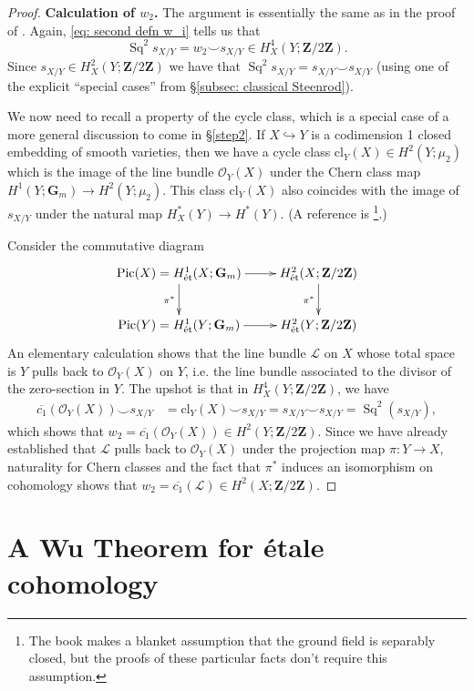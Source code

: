 \documentclass[10pt, reqno]{amsart}
\numberwithin{equation}{subsection}
\newcommand{\G}{\mathbf{G}}
\newcommand{\Z}{\mathbf{Z}}
\newcommand{\ol}[1]{\overline{#1}}
\newcommand{\Cal}[1]{\mathcal{#1}}
\newcommand{\mrm}[1]{\mathrm{#1}}
\DeclareMathOperator{\et}{\acute{e}t}
\DeclareMathOperator{\Pic}{Pic}
\DeclareMathOperator{\Sq}{Sq}
\theoremstyle{remark}
\begin{document}
\begin{proof}
\noindent \textbf{Calculation of $w_2$.} The argument is essentially the same as in the proof of \cite[Lemma 2.6]{Urabe96}. Again, \eqref{eq: second defn w_i} tells us that
\[
\Sq^2 s_{X/Y} = w_2 \smile s_{X/Y} \in H^4_X(Y; \Z/2\Z). 
\]
Since $s_{X/Y} \in H^2_X(Y; \Z/2\Z)$ we have that $\Sq^2s_{X/Y} = s_{X/Y} \smile s_{X/Y}$ (using one of the explicit ``special cases'' from \S \ref{subsec: classical Steenrod}). 


We now need to recall a property of the cycle class, which is a special case of a more general discussion to come in \S \ref{step2}. If $X \hookrightarrow Y$ is a codimension 1 closed embedding of smooth varieties, then we have a cycle class $\mrm{cl}_Y(X) \in H^2(Y; \mu_2)$ which is the image of the line bundle $\Cal{O}_Y(X)$ under the Chern class map $H^1(Y; \G_m) \rightarrow H^2(Y; \mu_2)$. This class $\mrm{cl}_Y(X)$ also coincides with the image of $s_{X/Y}$ under the natural map $H_X^*(Y) \rightarrow H_{\et}^*(Y)$. (A reference is \cite[Proposition II.2.2 and Proposition II.2.6]{FK88}\footnote{The book \cite{FK88} makes a blanket assumption that the ground field is separably closed, but the proofs of these particular facts don't require this assumption.}.)

Consider the commutative diagram 
\[
\xymatrix{
\Pic(X)  = H^1_{\et}(X; \G_m) \ar[r] \ar[d]_{\pi^*} & H^2_{\et}(X; \Z/2\Z) \ar[d]_{\pi^*} \\
\Pic(Y) = H^1_{\et}(Y; \G_m) \ar[r] & H^2_{\et}(Y; \Z/2\Z)
}
\]
An elementary calculation shows that the line bundle $\Cal{L}$ on $X$ whose total space is $Y$ pulls back to $\Cal{O}_Y(X)$ on $Y$, i.e. the line bundle associated to the divisor of the zero-section in $Y$. The upshot is that in $H^4_X(Y; \Z/2\Z)$, we have 
\begin{align*}
\ol{c_1}(\Cal{O}_Y(X)) \smile s_{X/Y} & =\mrm{cl}_Y(X) \smile s_{X/Y} = s_{X/Y} \smile s_{X/Y} = \Sq^2 (s_{X/Y} ),
\end{align*}
which shows that $w_2 = \ol{c_1}(\Cal{O}_Y(X)) \in H^2_{\et}(Y; \Z/2\Z)$. Since we have already established that $\Cal{L}$ pulls back to $\Cal{O}_Y(X)$ under the projection map $\pi \colon Y \rightarrow X$, naturality for Chern classes and the fact that $\pi^*$ induces an isomorphism on cohomology shows that $w_2 = \ol{c_1}(\Cal{L}) \in H_{\et}^2(X; \Z/2\Z)$. 
\end{proof}


\section{A Wu Theorem for \'{e}tale cohomology}\label{sec: Wu}
\end{document}
